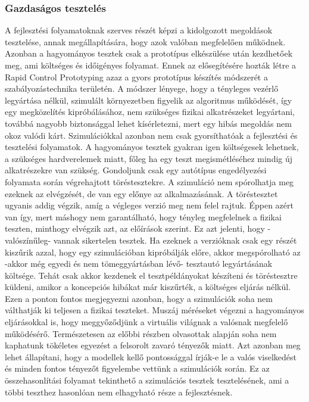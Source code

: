         \subsubsection{Gazdaságos tesztelés}
        A fejlesztési folyamatoknak szerves részét képzi a kidolgozott megoldások tesztelése, annak megállapítására, hogy azok valóban megfelelően működnek.
        Azonban a hagyományos tesztek csak a prototípus elkészülése után kezdhetőek meg, ami költséges és időigényes folyamat. Ennek az elősegítésére hozták létre a Rapid Control Prototyping azaz a gyors prototípus készítés módszerét a szabályozástechnika területén.
        A módszer lényege, hogy a tényleges vezérlő legyártása nélkül, szimulált környezetben figyelik az algoritmus működését, így egy megközelítés kipróbálásához, nem szükséges fizikai alkatrészeket legyártani, továbbá nagyobb biztonsággal lehet kísérletezni, mert egy hibás megoldás nem okoz valódi kárt.
        Szimulációkkal azonban nem csak gyorsíthatóak a fejlesztési és tesztelési folyamatok. A hagyományos tesztek gyakran igen költségesek lehetnek, a szükséges hardverelemek miatt, főleg ha egy teszt megismétléséhez mindig új alkatrészekre van szükség.
        Gondoljunk csak egy autótípus engedélyezési folyamata során végrehajtott töréstesztekre.
        A szimuláció nem spórolhatja meg ezeknek az elvégzését, de van egy előnye az alkalmazásának.
        A töréstesztet ugyanis addig végzik, amíg a végleges verzió meg nem felel rajtuk. Éppen azért van így, mert máshogy nem garantálható, hogy tényleg megfelelnek a fizikai teszten, minthogy elvégzik azt, az előírások szerint.
        Ez azt jelenti, hogy -valószínűleg- vannak sikertelen tesztek. Ha ezeknek a verzióknak csak egy részét kiszűrik azzal, hogy egy szimulációban kipróbálják előre, akkor megspórolható az -akkor még egyedi és nem tömeggyártásban lévő- tesztautó legyártásának költsége.
        Tehát csak akkor kezdenek el tesztpéldányokat készíteni és töréstesztre küldeni, amikor a koncepciós hibákat már kiszűrték, a költséges eljárás nélkül.
        Ezen a ponton fontos megjegyezni azonban, hogy a szimulációk soha nem válthatják ki teljesen a fizikai teszteket.
        Muszáj méréseket végezni a hagyományos eljárásokkal is, hogy meggyőződjünk a virtuális világnak a valósnak megfelelő működésérő. Természetesen az előbbi részben olvasottak alapján soha nem kaphatunk tökéletes egyezést a felsorolt zavaró tényezők miatt.
        Azt azonban meg lehet állapítani, hogy a modellek kellő pontossággal írják-e le a valós viselkedést és minden fontos tényezőt figyelembe vettünk a szimulációk során.
        Ez az összehasonlítási folyamat tekinthető a szimulációs tesztek tesztelésének, ami a többi teszthez hasonlóan nem elhagyható része a fejlesztésnek.

